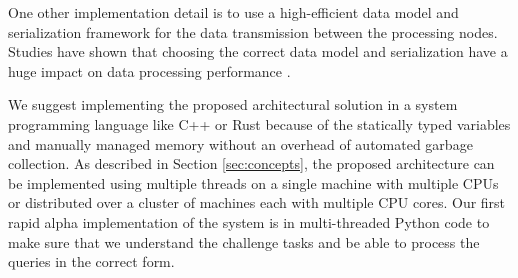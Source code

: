 One other implementation detail is to use a high-efficient data model and serialization framework for the data transmission between
the processing nodes. Studies have shown that choosing the correct data model and serialization have a huge impact on data processing performance \cite{DBLP:conf/cloud/SikdarTJ17}.

We suggest implementing the proposed architectural solution in a system programming language like C++ or Rust because of the statically typed variables and manually managed memory without an overhead of automated garbage collection. As described in Section \ref{sec:concepts}, the proposed architecture can be implemented using multiple threads on a single machine with multiple CPUs or distributed over a cluster of machines each with multiple CPU cores.
Our first rapid alpha implementation of the system is in multi-threaded Python code to make sure that we understand the challenge tasks and be able to process the queries in the correct form.
